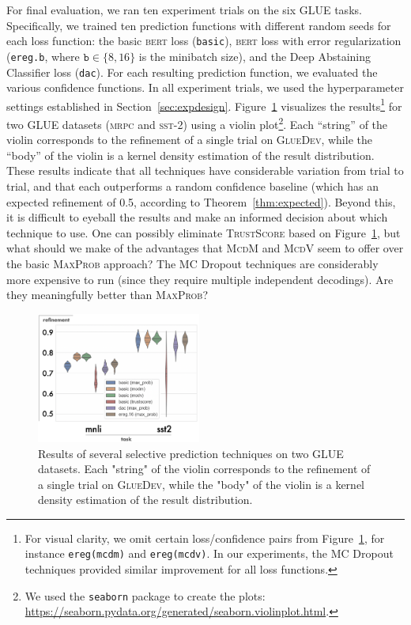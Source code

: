 \documentclass[11pt]{article}
\begin{document}
For final evaluation, we ran ten experiment trials on the six GLUE tasks. Specifically, we trained ten prediction functions with different random seeds for each loss function: the basic \textsc{bert} loss (\texttt{basic}), \textsc{bert} loss with error regularization (\texttt{ereg.b}, where $\texttt{b} \in \{8, 16\}$ is the minibatch size), and the Deep Abstaining Classifier loss (\texttt{dac}). For each resulting prediction function, we evaluated the various confidence functions. In all experiment trials, we used the hyperparameter settings established in Section~\ref{sec:expdesign}. Figure~\ref{fig:posthocviolin} visualizes the results\footnote{For visual clarity, we omit certain loss/confidence pairs from Figure~\ref{fig:posthocviolin}, for instance \texttt{ereg(mcdm)} and \texttt{ereg(mcdv)}. In our experiments, the MC Dropout techniques provided similar improvement for all loss functions.} for two GLUE datasets (\textsc{mrpc} and \textsc{sst-2}) using a violin plot\footnote{We used the \texttt{seaborn} package to create the plots: \url{https://seaborn.pydata.org/generated/seaborn.violinplot.html}.}. Each ``string'' of the violin corresponds to the refinement of a single trial on \textsc{GlueDev}, while the ``body'' of the violin is a kernel density estimation of the result distribution. These results indicate that all techniques have considerable variation from trial to trial, and that each outperforms a random confidence baseline (which has an expected refinement of 0.5, according to Theorem~\ref{thm:expected}). Beyond this, it is difficult to eyeball the results and make an informed decision about which technique to use. One can possibly eliminate \textsc{TrustScore} based on Figure~\ref{fig:posthocviolin}, but what should we make of the advantages that \textsc{McdM} and \textsc{McdV} seem to offer over the basic \textsc{MaxProb} approach? The MC Dropout techniques are considerably more expensive to run (since they require multiple independent decodings). Are they meaningfully better than \textsc{MaxProb}? 

\begin{figure}
\centering
\includegraphics[width=0.48\textwidth]{violinplot2.png}
\caption{Results of several selective prediction techniques on two \textsc{GLUE} datasets. Each "string" of the violin corresponds to the refinement of a single trial on \textsc{GlueDev}, while the "body" of the violin is a kernel density estimation of the result distribution.}
\label{fig:posthocviolin}
\end{figure}
\end{document}
